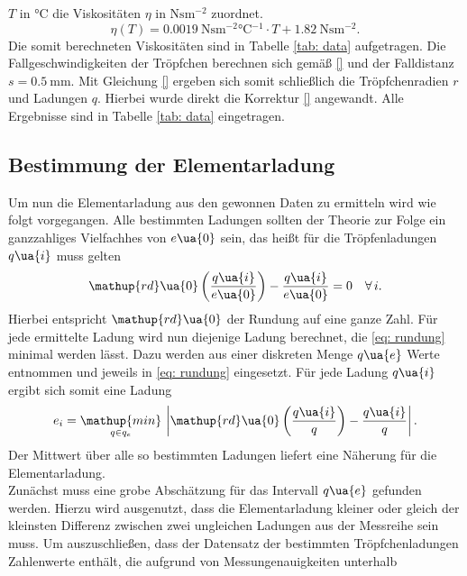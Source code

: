 $T$ in $\si{\celsius}$ die Viskositäten $\eta$ in $\si{\newton\second\meter^{-2}}$ zuordnet.
\begin{equation}
  \eta(T) = \SI{0.0019}{\newton\second\meter^{-2} \celsius^{-1} } \cdot  T  + \SI{1.82}{\newton\second\meter^{-2}}.
\end{equation}
Die somit berechneten Viskositäten sind in Tabelle \ref{tab: data} aufgetragen.
Die Fallgeschwindigkeiten der Tröpfchen berechnen sich gemäß \eqref{} und der Falldistanz $s = \SI{0.5}{\milli\meter}$.
Mit Gleichung \eqref{} ergeben sich somit schließlich die Tröpfchenradien $r$ und Ladungen $q$. Hierbei wurde
direkt die Korrektur \eqref{} angewandt. Alle Ergebnisse sind in Tabelle \ref{tab: data} eingetragen. \\


\subsection{Bestimmung der Elementarladung}
Um nun die Elementarladung aus den gewonnen Daten zu ermitteln wird wie folgt vorgegangen. Alle bestimmten
Ladungen sollten der Theorie zur Folge ein ganzzahliges Vielfachhes von $e\ua{0}$ sein, das heißt für die
Tröpfenladungen $q\ua{i}$ muss gelten
\begin{equation}
  \mathup{rd}\ua{0}\left(\frac{q\ua{i}}{e\ua{0}}\right) - \frac{q\ua{i}}{e\ua{0}} = 0 \quad \forall\, i.
  \label{eq: rundung}
\end{equation}
Hierbei entspricht $\mathup{rd}\ua{0}$ der Rundung auf eine ganze Zahl. Für jede ermittelte Ladung wird nun diejenige
Ladung berechnet, die \eqref{eq: rundung} minimal werden lässt. Dazu werden aus einer diskreten Menge $q\ua{e}$ Werte entnommen
und jeweils in \eqref{eq: rundung} eingesetzt. Für jede Ladung $q\ua{i}$ ergibt sich somit eine Ladung
\begin{equation}
  e_i = \underset{q \in q_e}{\mathup{min}}\, \left|\mathup{rd}\ua{0}\left(\frac{q\ua{i}}{q}\right) - \frac{q\ua{i}}{q}\right|.
\end{equation}
Der Mittwert über alle so bestimmten Ladungen liefert eine Näherung für die Elementarladung.\\
Zunächst muss eine grobe Abschätzung für das Intervall $q\ua{e}$ gefunden werden. Hierzu wird ausgenutzt, dass die Elementarladung
kleiner oder gleich der kleinsten Differenz zwischen zwei ungleichen Ladungen aus der Messreihe sein muss. Um auszuschließen, dass
der Datensatz der bestimmten Tröpfchenladungen Zahlenwerte enthält, die aufgrund von Messungenauigkeiten unterhalb

